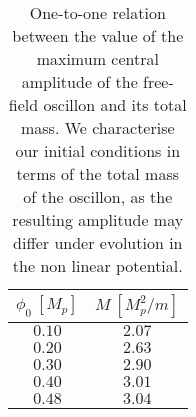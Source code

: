 \documentclass[11pt,a4paper]{article}
\begin{document}
\begin{table}[h!]
\centering
\begin{tabular}{|c|c|}
\hline
$\phi_0 ~ [M_p]$ & $M ~ [M_p^2/m]$ \\ \hline
$0.10$ & $2.07$ \\ \hline
$0.20$ & $2.63$ \\ \hline
$0.30$ & $2.90$ \\ \hline
$0.40$ & $3.01$ \\ \hline
$0.48$ & $3.04$ \\ \hline
\end{tabular}
\caption{One-to-one relation between the value of the maximum central amplitude of the free-field oscillon and its total mass. We characterise our initial conditions in terms of the total mass of the oscillon, as the resulting amplitude may differ under evolution in the non linear potential. \label{tab:1to1Relation}}
\end{table}
\end{document}

